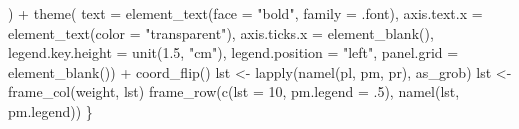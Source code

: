 \documentclass[
]{article}
\newenvironment{Shaded}{\begin{snugshade}}{\end{snugshade}}
\newcommand{\AttributeTok}[1]{\textcolor[rgb]{0.77,0.63,0.00}{#1}}
\newcommand{\DecValTok}[1]{\textcolor[rgb]{0.00,0.00,0.81}{#1}}
\newcommand{\FloatTok}[1]{\textcolor[rgb]{0.00,0.00,0.81}{#1}}
\newcommand{\FunctionTok}[1]{\textcolor[rgb]{0.00,0.00,0.00}{#1}}
\newcommand{\NormalTok}[1]{#1}
\newcommand{\OtherTok}[1]{\textcolor[rgb]{0.56,0.35,0.01}{#1}}
\newcommand{\SpecialCharTok}[1]{\textcolor[rgb]{0.00,0.00,0.00}{#1}}
\newcommand{\StringTok}[1]{\textcolor[rgb]{0.31,0.60,0.02}{#1}}
\begin{document}
\begin{Shaded}
\begin{Highlighting}[]
\NormalTok{        ) }\SpecialCharTok{+}
      \FunctionTok{theme}\NormalTok{(}
        \AttributeTok{text =} \FunctionTok{element\_text}\NormalTok{(}\AttributeTok{face =} \StringTok{"bold"}\NormalTok{, }\AttributeTok{family =}\NormalTok{ .font),}
        \AttributeTok{axis.text.x =} \FunctionTok{element\_text}\NormalTok{(}\AttributeTok{color =} \StringTok{"transparent"}\NormalTok{),}
        \AttributeTok{axis.ticks.x =} \FunctionTok{element\_blank}\NormalTok{(),}
        \AttributeTok{legend.key.height =} \FunctionTok{unit}\NormalTok{(}\FloatTok{1.5}\NormalTok{, }\StringTok{"cm"}\NormalTok{),}
        \AttributeTok{legend.position =} \StringTok{"left"}\NormalTok{,}
        \AttributeTok{panel.grid =} \FunctionTok{element\_blank}\NormalTok{()) }\SpecialCharTok{+}
      \FunctionTok{coord\_flip}\NormalTok{()}
\NormalTok{    lst }\OtherTok{\textless{}{-}} \FunctionTok{lapply}\NormalTok{(}\FunctionTok{namel}\NormalTok{(pl, pm, pr), as\_grob)}
\NormalTok{    lst }\OtherTok{\textless{}{-}} \FunctionTok{frame\_col}\NormalTok{(weight, lst)}
    \FunctionTok{frame\_row}\NormalTok{(}\FunctionTok{c}\NormalTok{(}\AttributeTok{lst =} \DecValTok{10}\NormalTok{, }\AttributeTok{pm.legend =}\NormalTok{ .}\DecValTok{5}\NormalTok{), }\FunctionTok{namel}\NormalTok{(lst, pm.legend))}
\NormalTok{  \}}


\end{Highlighting}
\end{Shaded}
\end{document}
